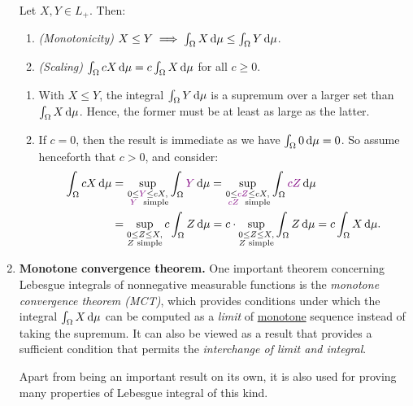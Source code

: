 \begin{enumerate}
\begin{lemma}
\label{lma:leb-int-nonneg-mono-scal}
Let \(X,Y\in L_{+}\). Then:
\begin{enumerate}
\item \emph{(Monotonicity)} \(X\le Y\implies \int_{\Omega}^{}X\odif{\mu}\le\int_{\Omega}^{}Y\odif{\mu}\).
\item \emph{(Scaling)} \(\int_{\Omega}^{}cX\odif{\mu}=c\int_{\Omega}^{}X\odif{\mu}\) for all \(c\ge 0\).
\end{enumerate}
\end{lemma}
\begin{pf}
\begin{enumerate}
\item With \(X\le Y\), the integral \(\int_{\Omega}^{}Y\odif{\mu}\) is a
supremum over a larger set than \(\int_{\Omega}^{}X\odif{\mu}\). Hence, the
former must be at least as large as the latter.
\item If \(c=0\), then the result is immediate as we have
\(\int_{\Omega}^{}0\odif{\mu}=0\). So assume henceforth that \(c>0\), and
consider:
\begin{align*}
\int_{\Omega}^{}cX\odif{\mu}
&=\sup_{\substack{0\le \vc{Y}\le cX,\\ \text{\vc{\(Y\)} simple}}}
\int_{\Omega}^{}\vc{Y}\odif{\mu}
=\sup_{\substack{0\le \vc{cZ}\le cX,\\ \text{\vc{\(cZ\)} simple}}}
\int_{\Omega}^{}\vc{cZ}\odif{\mu} \\
&=\sup_{\substack{0\le Z\le X,\\ \text{\(Z\) simple}}}
c\int_{\Omega}^{}Z\odif{\mu}
=c\cdot \sup_{\substack{0\le Z\le X,\\ \text{\(Z\) simple}}}
\int_{\Omega}^{}Z\odif{\mu}
=c\int_{\Omega}^{}X\odif{\mu}.
\end{align*}
\end{enumerate}
\end{pf}
\item \textbf{Monotone convergence theorem.} One important theorem concerning
Lebesgue integrals of nonnegative measurable functions is the \emph{monotone
convergence theorem (MCT)}, which provides conditions under which the integral
\(\int_{\Omega}^{}X\odif{\mu}\) can be computed as a \emph{limit} of
\underline{monotone} sequence instead of taking the supremum. It can also be
viewed as a result that provides a sufficient condition that permits the
\emph{interchange of limit and integral}.

Apart from being an important result on its own, it is also used for proving
many properties of Lebesgue integral of this kind.


\end{enumerate}
